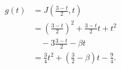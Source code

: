 \begin{equation}\label{eq:reduced}
\begin{split}
g(t)&=J\!\left(\frac{3-t}{2},t\right)\\
&=\left(\frac{3-t}{2}\right)^2
  +\frac{3-t}{2}t+t^2\\
&\quad-3\frac{3-t}{2}-\beta t\\
&=\frac34t^2+
  \left(\frac32-\beta\right)t-\frac94.
\end{split}
\end{equation}
